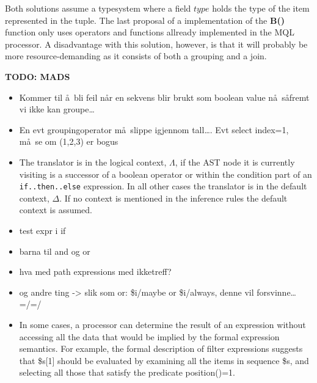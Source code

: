 Both solutions assume a typesystem where a field $type$ holds the type of the item represented in the tuple. The
last proposal of a implementation of the \textbf{B()} function only uses operators and functions allready
implemented in the MQL processor. A disadvantage with this solution, however, is that it will probably be more
resource-demanding as it consists of both a grouping and a join.

\textbf{\LARGE TODO: {MADS}}
\begin{itemize}

\item Kommer til \aa~bli feil n\aa r en sekvens blir brukt som boolean value n\aa~s\aa fremt vi ikke kan groupe\ldots
\item En evt groupingoperator m\aa~slippe igjennom tall\ldots. Evt select index=1, m\aa~se om (1,2,3) er bogus
\item The translator is in the logical context, $\Lambda$, if the AST node it is currently visiting is a successor
of a boolean operator or within the condition part of an \texttt{if..then..else} expression. In all other cases the
translator is in the default context, $\Delta$. If no context is mentioned in the inference rules the default
context is assumed. 
\item test expr i if
\item barna til and og or
\item hva med path expressions med ikketreff? 
\item og andre ting -> slik som or: \$i/maybe or \$i/always, denne vil forsvinne\ldots =/=/ 
\end{itemize}

\begin{itemize} 
   \item In some cases, a processor can determine the result of an expression without accessing all the data that
   would be implied by the formal expression semantics. For example, the formal description of filter expressions
   suggests that \$s[1] should be evaluated by examining all the items in sequence \$s, and selecting all those
   that satisfy the predicate position()=1.
\end{itemize}

